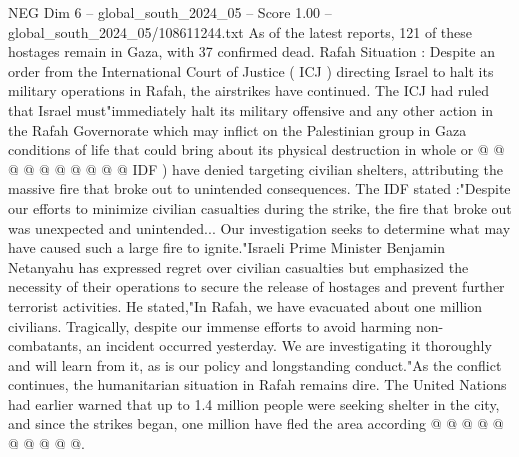 \begin{textsample}{NEG Dim 6 – global\_south\_2024\_05 – Score 1.00 – global\_south\_2024\_05/108611244.txt}
As of the latest reports, 121 of these hostages remain in Gaza, with 37 confirmed dead.
Rafah Situation : Despite an order from the International Court of Justice ( ICJ ) directing Israel to halt its military operations in Rafah, the airstrikes have continued.
The ICJ had ruled that Israel must"immediately halt its military offensive and any other action in the Rafah Governorate which may inflict on the Palestinian group in Gaza conditions of life that could bring about its physical destruction in whole or @ @ @ @ @ @ @ @ @ @ IDF ) have denied targeting civilian shelters, attributing the massive fire that broke out to unintended consequences.
The IDF stated :"Despite our efforts to minimize civilian casualties during the strike, the fire that broke out was unexpected and unintended...
Our investigation seeks to determine what may have caused such a large fire to ignite."Israeli Prime Minister Benjamin Netanyahu has expressed regret over civilian casualties but emphasized the necessity of their operations to secure the release of hostages and prevent further terrorist activities.
He stated,"In Rafah, we have evacuated about one million civilians.
Tragically, despite our immense efforts to avoid harming non-combatants, an incident occurred yesterday.
We are investigating it thoroughly and will learn from it, as is our policy and longstanding conduct."As the conflict continues, the humanitarian situation in Rafah remains dire.
The United Nations had earlier warned that up to 1.4 million people were seeking shelter in the city, and since the strikes began, one million have fled the area according @ @ @ @ @ @ @ @ @ @.

\end{textsample}
